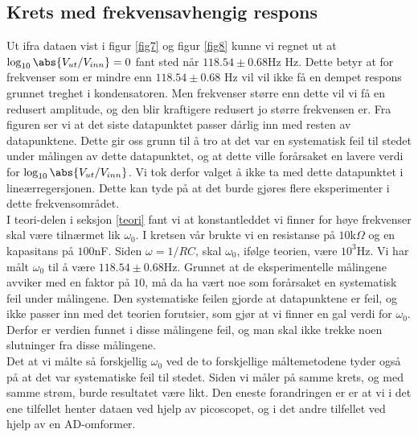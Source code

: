 \documentclass[%
 reprint,
nofootinbib,
aps,
]{revtex4-1}
\begin{document}
\subsection{Krets med frekvensavhengig respons}
Ut ifra dataen vist i figur \ref{fig7} og figur \ref{fig8} kunne vi regnet ut at $\log_{10} \abs{{V_{ut}/V_{inn}}} = 0$ fant sted når $118.54 \pm 0.68$Hz Hz. Dette betyr at for frekvenser som er mindre enn $118.54 \pm 0.68$ Hz vil vil ikke få en dempet respons grunnet treghet i kondensatoren. Men frekvenser større enn dette vil vi få en redusert amplitude, og den blir kraftigere redusert jo større frekvensen er. Fra figuren ser vi at det siste datapunktet passer dårlig inn med resten av datapunktene. Dette gir oss grunn til å tro at det var en systematisk feil til stedet under målingen av dette datapunktet, og at dette ville forårsaket en lavere verdi for $\log_{10} \abs{{V_{ut}/V_{inn}}}$. Vi tok derfor valget å ikke ta med dette datapunktet i lineærregersjonen. Dette kan tyde på at det burde gjøres flere eksperimenter i dette frekvensområdet.\\
I teori-delen i seksjon \ref{teori} fant vi at konstantleddet vi finner for høye frekvenser skal være tilnærmet lik $\omega_0$. I kretsen vår brukte vi en resistanse på $10$k$\Omega$ og en kapasitans på $100$nF. Siden $\omega = 1/RC$, skal $\omega_0$, ifølge teorien, være $10^3$Hz. Vi har målt $\omega_0$ til å være $118.54\pm0.68$Hz. Grunnet at de eksperimentelle målingene avviker med en faktor på $10$, må da ha vært noe som forårsaket en systematisk feil under målingene. Den systematiske feilen gjorde at datapunktene er feil, og ikke passer inn med det teorien forutsier, som gjør at vi finner en gal verdi for $\omega_0$. Derfor er verdien funnet i disse målingene feil, og man skal ikke trekke noen slutninger fra disse målingene. \\
Det at vi målte så forskjellig $\omega_0$ ved de to forskjellige måltemetodene tyder også på at det var systematiske feil til stedet. Siden vi måler på samme krets, og med samme strøm, burde resultatet være likt. Den eneste forandringen er er at vi i det ene tilfellet henter dataen ved hjelp av picoscopet, og i det andre tilfellet ved hjelp av en AD-omformer.
\end{document}
